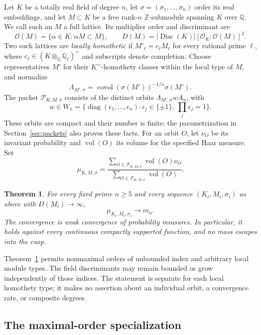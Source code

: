 \documentclass[11pt]{article}
\newtheorem{theorem}{Theorem}[section]
\theoremstyle{remark}
\newcommand{\Z}{\mathbb Z}
\newcommand{\Q}{\mathbb Q}
\DeclareMathOperator{\vol}{vol}
\DeclareMathOperator{\Disc}{Disc}
\DeclareMathOperator{\diag}{diag}
\newcommand{\cO}{\mathcal O}
\numberwithin{equation}{section}
\begin{document}
Let $K$ be a totally real field of degree $n$, let
$\sigma=(\sigma_1,\ldots,\sigma_n)$ order its real embeddings, and let
$M\subset K$ be a free rank-$n$ $\Z$-submodule spanning $K$ over $\Q$.
We call such an $M$ a full lattice. Its multiplier order and discriminant
are
\[
 \cO(M)=\{\alpha\in K:\alpha M\subset M\},\qquad
 D(M)=|\Disc(K)|[\cO_K:\cO(M)]^2.
\]
Two such lattices are \emph{locally homothetic} if
$M'_\ell=c_\ell M_\ell$ for every rational prime $\ell$, where
$c_\ell\in(K\otimes_\Q\Q_\ell)^\times$ and subscripts denote completion.
Choose representatives $M'$ for their $K^\times$-homothety classes
within the local type of $M$, and normalize
\[
 \Lambda_{M',\sigma}
 =\operatorname{covol}(\sigma(M'))^{-1/n}\sigma(M').
\]
The packet $\mathcal P_{K,M,\sigma}$ consists of the distinct orbits
$\Lambda_{M',\sigma}wA_n$, with
\[
 w\in W_n=\{\diag(\epsilon_1,\ldots,\epsilon_n):
       \epsilon_j\in\{\pm1\},\ \textstyle\prod_j\epsilon_j=1\}.
\]
These orbits are compact and their number is finite; the
parametrization in Section~\ref{sec:packets} also proves these facts.
For an orbit $O$, let $\nu_O$ be its invariant probability and
$\vol(O)$ its volume for the specified Haar measure. Set
\begin{equation}\label{eq:packet-probability}
 \mu_{K,M,\sigma}
 =\frac{\sum_{O\in\mathcal P_{K,M,\sigma}}\vol(O)\nu_O}
        {\sum_{O\in\mathcal P_{K,M,\sigma}}\vol(O)}.
\end{equation}

\begin{theorem}\label{thm:main}
For every fixed prime $n\ge5$ and every sequence
$(K_i,M_i,\sigma_i)$ as above with \mbox{$D(M_i)\to\infty$},
\[
 \mu_{K_i,M_i,\sigma_i}\longrightarrow m_n.
\]
The convergence is weak convergence of probability measures. In
particular, it holds against every continuous compactly supported
function, and no mass escapes into the cusp.
\end{theorem}

Theorem~\ref{thm:main} permits nonmaximal orders of unbounded index
and arbitrary local module types. The field discriminants may remain
bounded or grow independently of those indices. The statement is
separate for each local homothety type; it makes no assertion about an
individual orbit, a convergence rate, or composite degrees.

\subsection*{The maximal-order specialization}
\end{document}
